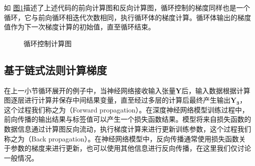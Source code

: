 \documentclass[letterpaper,10pt,english]{sphinxmanual}
\let\sphinxpxdimen\pdfpxdimen\else\newdimen\sphinxpxdimen
\begin{document}
\sphinxAtStartPar
如
\hyperref[\detokenize{chapter_computational_graph/components_of_computational_graph:while}]{图\ref{\detokenize{chapter_computational_graph/components_of_computational_graph:while}}}描述了上述代码的前向计算图和反向计算图，循环控制的梯度同样也是一个循环，它与前向循环相迭代次数相同，执行循环体的梯度计算。循环体输出的梯度值作为下一次梯度计算的初始值，直至循环结束。

\begin{figure}[H]
\centering
\capstart

\noindent\sphinxincludegraphics[width=600\sphinxpxdimen]{{while}.svg}
\caption{循环控制计算图}\label{\detokenize{chapter_computational_graph/components_of_computational_graph:id14}}\label{\detokenize{chapter_computational_graph/components_of_computational_graph:while}}\end{figure}


\subsection{基于链式法则计算梯度}
\label{\detokenize{chapter_computational_graph/components_of_computational_graph:id5}}
\sphinxAtStartPar
在上一小节循环展开的例子中，当神经网络接收输入张量\(\boldsymbol{Y}\)后，输入数据根据计算图逐层进行计算并保存中间结果变量，直至经过多层的计算后最终产生输出\(\boldsymbol{Y_3}\)，这个过程我们称之为（Forward
propagation）。在深度神经网络模型训练过程中，前向传播的输出结果与标签值可以产生一个损失函数结果。模型将来自损失函数的数据信息通过计算图反向流动，执行梯度计算来进行更新训练参数，这个过程我们称之为（Back
propagation）。在神经网络模型中，反向传播通常使用损失函数关于参数的梯度来进行更新，也可以使用其他信息进行反向传播，在这里我们仅讨论一般情况。
\end{document}

